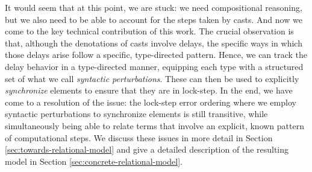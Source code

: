 
It would seem that at this point, we are stuck: we need compositional reasoning,
but we also need to be able to account for the steps taken by casts. And now we
come to the key technical contribution of this work. The crucial observation is
that, although the denotations of casts involve delays, the specific ways in
which those delays arise follow a specific, type-directed pattern. Hence, we can
track the delay behavior in a type-directed manner, equipping each type with a
structured set of what we call \emph{syntactic perturbations}. These can then be
used to explicitly \emph{synchronize} elements to ensure that they are in lock-step.
%
In the end, we have come to a resolution of the issue: the lock-step error
ordering where we employ syntactic perturbations to synchronize elements is
still transitive, while simultaneously being able to relate terms that involve
an explicit, known pattern of computational steps.
%
We discuss these issues in more detail in Section
\ref{sec:towards-relational-model} and give a detailed description of the
resulting model in Section \ref{sec:concrete-relational-model}.






